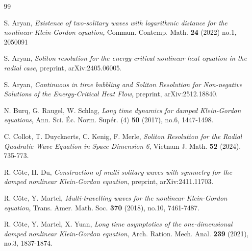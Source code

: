 \documentclass[reqno]{amsart}
\theoremstyle{plain}
\theoremstyle{definition}
\numberwithin{equation}{section}
\newcommand{\1}{\mathbbm{1}}
\begin{document}
\begin{thebibliography}{99}
%
%

 S. Aryan,
\textit{Existence of two-solitary waves with logarithmic distance for the nonlinear Klein-Gordon equation,}
Commun. Contemp. Math. \textbf{24} (2022) no.1, 2050091


 S. Aryan,
\textit{Soliton resolution for the energy-critical nonlinear heat equation in the radial case},
preprint, arXiv:2405.06005.

 S. Aryan,
\textit{Continuous in time bubbling and Soliton Resolution for Non-negative Solutions of the Energy-Critical Heat Flow},
preprint, arXiv:2512.18840.



 N. Burq, G. Raugel, W. Schlag,
\textit{Long time dynamics for damped Klein-Gordon equations},
Ann. Sci. \'{E}c. Norm. Sup\'{e}r. (4) \textbf{50} (2017), no.6, 1447-1498.







 C. Collot, T. Duyckaerts, C. Kenig, F. Merle,
\textit{Soliton Resolution for the Radial Quadratic Wave Equation in Space Dimension 6},
Vietnam J. Math. \textbf{52} (2024), 735-773.

 R. C\^{o}te, H. Du,
\textit{Construction of multi solitary waves with symmetry for the damped nonlinear Klein-Gordon equation},
preprint, arXiv:2411.11703.




 R. C\^{o}te, Y. Martel,
\textit{Multi-travelling waves for the nonlinear Klein-Gordon equation},
Trans. Amer. Math. Soc. \textbf{370} (2018), no.10, 7461-7487.




 R. C\^{o}te, Y. Martel, X. Yuan, 
\textit{Long time asymptotics of the one-dimensional damped nonlinear Klein-Gordon equation},
Arch. Ration. Mech. Anal. {\bf 239} (2021), no.3, 1837-1874.




\end{thebibliography}
\end{document}
